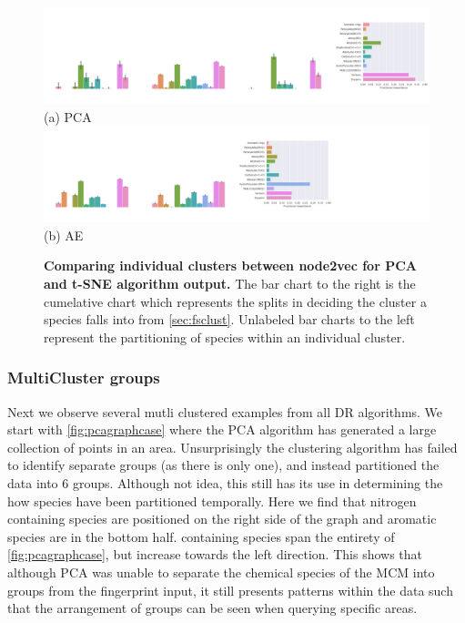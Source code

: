 \begin{landscape}
\begin{figure}[H]
         \includegraphics[width=1.65\textheight]{./outputs/PCA/node2vec/group.png}
         \\ (a) PCA \\
     \hfill
            \includegraphics[width=1.65\textheight]{./outputs/AE/node2vec/group.png}
        \\ (b) AE
        \caption{ \textbf{Comparing individual clusters between node2vec for PCA and t-SNE algorithm output.} The bar chart to the right is the cumelative chart which represents the splits in deciding the cluster a species falls into from \autoref{sec:fsclust}. Unlabeled bar charts to the left represent the partitioning of species within an individual cluster.}
        \label{fig:biN2V}
\end{figure}
\end{landscape}



\subsubsection{MultiCluster groups}\label{sec:multigroups}

Next we observe several mutli clustered examples from all DR algorithms. We start with \autoref{fig:pcagraphcase} where the PCA algorithm has generated a large collection of points in an area. Unsurprisingly the clustering algorithm has failed to identify separate groups (as there is only one), and instead partitioned the data into 6 groups. Although not idea, this still has its use in determining the how species have been partitioned temporally. Here we find that nitrogen containing species are positioned on the right side of the graph and aromatic species are in the bottom half.  containing species span the entirety of \autoref{fig:pcagraphcase}, but increase towards the left direction. This shows that although PCA was unable to separate the chemical species of the MCM into groups from the fingerprint input, it still presents patterns within the data such that the arrangement of groups can be seen when querying specific areas.





